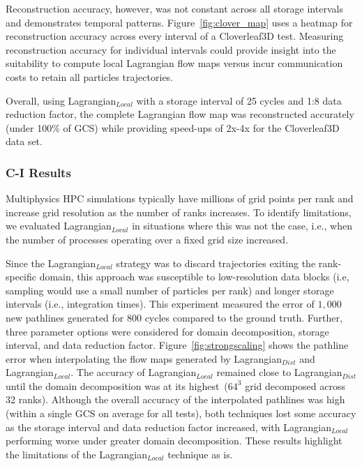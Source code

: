 Reconstruction accuracy, however, was not constant across all storage intervals and demonstrates temporal patterns.
%
%
Figure~\ref{fig:clover_map} uses a heatmap for reconstruction accuracy across every interval of a Cloverleaf3D test. 
%
Measuring reconstruction accuracy for individual intervals could provide insight into the suitability to compute local Lagrangian flow maps versus incur communication costs to retain all particles trajectories.
%
%


%
Overall, using Lagrangian$_{Local}$ with a storage interval of 25 cycles and 1:8 data reduction factor, the complete Lagrangian flow map was reconstructed accurately (under 100\% of GCS) while providing speed-ups of 2x-4x for the Cloverleaf3D data set.

\subsubsection{C-I Results} 
%

%
Multiphysics HPC simulations typically have millions of grid points per rank and increase grid resolution as the number of ranks increases. 
%
To identify limitations, we evaluated Lagrangian$_{Local}$ in situations where this was not the case, i.e., when the number of processes operating over a fixed grid size increased.
%
%

Since the Lagrangian$_{Local}$ strategy was to discard trajectories exiting the rank-specific domain, this approach was susceptible to low-resolution data blocks (i.e, sampling would use a small number of particles per rank) and longer storage intervals (i.e., integration times).
%
This experiment measured the error of $1,000$ new pathlines generated for 800 cycles compared to the ground truth. 
%
Further, three parameter options were considered for domain decomposition, storage interval, and data reduction factor. 
%
Figure~\ref{fig:strongscaling} shows the pathline error when interpolating the flow maps generated by Lagrangian$_{Dist}$ and Lagrangian$_{Local}$. 
%
The accuracy of Lagrangian$_{Local}$ remained close to Lagrangian$_{Dist}$ until the domain decomposition was at its highest~($64^{3}$ grid decomposed across 32 ranks).
%
%
Although the overall accuracy of the interpolated pathlines was high (within a single GCS on average for all tests), both techniques lost some accuracy as the storage interval and data reduction factor increased, with Lagrangian$_{Local}$ performing worse under greater domain decomposition.
%
These results highlight the limitations of the Lagrangian$_{Local}$ technique as is.
%

